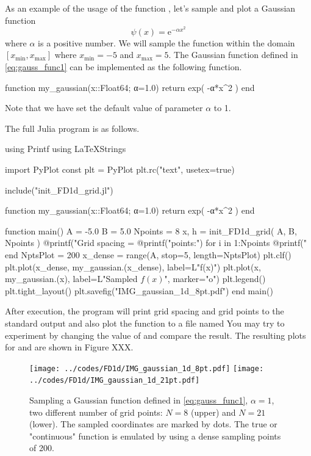 As an example of the usage of the function , let's
sample and plot a Gaussian function
%
\begin{equation}
\psi(x) = \mathrm{e}^{-\alpha x^2}
\label{eq:gauss_func1}
\end{equation}
%
where $\alpha$ is a positive number. We will sample the function
within the domain $[x_{\text{min}},x_{\text{max}}]$ where
$x_{\text{min}}=-5$ and $x_{\text{max}}=5$.
The Gaussian function defined in \eqref{eq:gauss_func1} can be implemented
as the following function.
\begin{juliacode}
function my_gaussian(x::Float64; α=1.0)
  return exp( -α*x^2 )
end
\end{juliacode}
Note that we have set the default value of parameter $\alpha$ to 1.

The full Julia program is as follows.
%
\begin{juliacode}
using Printf
using LaTeXStrings

import PyPlot
const plt = PyPlot
plt.rc("text", usetex=true)

include("init_FD1d_grid.jl")

function my_gaussian(x::Float64; α=1.0)
  return exp( -α*x^2 )
end

function main()
  A = -5.0
  B =  5.0
  Npoints = 8
  x, h = init_FD1d_grid( A, B, Npoints )
  @printf("Grid spacing = %
  @printf("\nGrid points:\n")
  for i in 1:Npoints
    @printf("%
  end
  NptsPlot = 200
  x_dense = range(A, stop=5, length=NptsPlot)
  plt.clf()
  plt.plot(x_dense, my_gaussian.(x_dense), label=L"f(x)")
  plt.plot(x, my_gaussian.(x), label=L"Sampled $f(x)$", marker="o")
  plt.legend()
  plt.tight_layout()
  plt.savefig("IMG_gaussian_1d_8pt.pdf")
end
main()
\end{juliacode}

After execution, the program will print grid spacing and grid points to the standard
output and also plot the function to a file named 
You may try to experiment by changing the value of  and compare the result.
The resulting plots for  and  are shown in Figure XXX.
\begin{figure}[H]
{\center
\texttt{[image: ../codes/FD1d/IMG\_gaussian\_1d\_8pt.pdf]}
\texttt{[image: ../codes/FD1d/IMG\_gaussian\_1d\_21pt.pdf]}
\par}
\caption{Sampling a Gaussian function defined in \eqref{eq:gauss_func1}, $\alpha=1$,
two different number of grid points: $N=8$ (upper) and $N=21$ (lower). The sampled
coordinates are marked by dots. The true or "continuous" function is emulated by using
a dense sampling points of 200.}
\end{figure}

